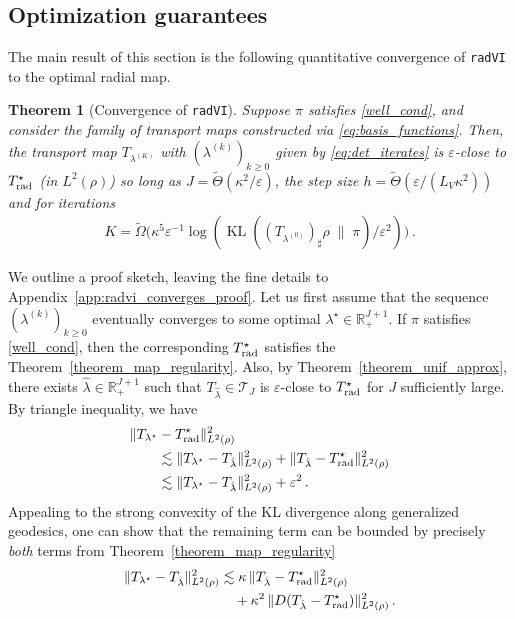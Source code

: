 \documentclass[twoside]{article}
\newcommand{\cT}{\mathcal{T}}
\newcommand{\1}{\mathds{1}}
\newcommand{\kl}[2]{\KL(#1 \!\;\|\; \!#2)}
\newcommand{\R}{\mathbb{R}}
\newcommand{\eps}{\varepsilon}
\renewcommand{\epsilon}{\varepsilon}
\DeclareMathOperator*{\KL}{KL}
\theoremstyle{plain}
\newtheorem{theorem}{Theorem}[section]
\theoremstyle{definition}
\theoremstyle{remark}
\renewcommand{\tilde}{\widetilde}
\begin{document}
\subsection{Optimization guarantees}\label{sec:opt_guarantees}
The main result of this section is the following quantitative convergence of \texttt{radVI} to the optimal radial map. 
{\begin{theorem}[Convergence of \texttt{radVI}]\label{thm:radvi_converges} Suppose $\pi$ satisfies \eqref{well_cond}, {and consider the family of transport maps constructed via \eqref{eq:basis_functions}.} Then, the transport map $T_{\lambda^{(K)}}$ with $(\lambda^{(k)})_{k\ge 0}$ given by \eqref{eq:det_iterates} is $\epsilon$-close to $T_{\rm rad}^\star$ (in $L^2(\rho)$) so long as $J = \tilde\Theta(\kappa^2/\eps)$, the step size $h = \widetilde\Theta(\eps/(L_V\kappa^2))$ and for iterations
\begin{align*}
     K = \tilde\Omega\bigl(\kappa^5\eps^{-1}\log(\kl{(T_{\lambda^{(0)}})_\sharp\rho}{\pi}/\eps^2)\bigr)\,.
\end{align*}
\end{theorem}}
{We outline a proof sketch, leaving the fine details to Appendix~\ref{app:radvi_converges_proof}.} Let us first assume that the sequence $(\lambda^{(k)})_{k \geq 0}$ eventually converges to some optimal $\lambda^\star \in \R^{J+1}_+$. If $\pi$ satisfies \eqref{well_cond}, then the corresponding $T^\star_{\rm rad}$ satisfies the Theorem~\ref{theorem_map_regularity}. Also, by Theorem~\ref{theorem_unif_approx}, there exists $\hat{\lambda} \in \R^{J+1}_+$ such that $T_{\hat{\lambda}} \in \cT_J$ is $\epsilon$-close to $T^\star_{\rm rad}$ for $J$ sufficiently large. By triangle inequality, we have
\begin{align*}
    &\| T_{\lambda^{\star}} - T^\star_{\rm rad}\|^2_{L^2(\rho)} \\
    &\qquad \lesssim \| T_{\lambda^{\star}} - T_{\hat\lambda}\|^2_{L^2(\rho)} + \| T_{\hat\lambda} - T^\star_{\rm rad}\|^2_{L^2(\rho)} \\
    &\qquad \lesssim \| T_{\lambda^{\star}} - T_{\hat\lambda}\|^2_{L^2(\rho)} + {\epsilon^2}\,.
\end{align*}
Appealing to the strong convexity of the KL divergence along generalized geodesics, one can show that the remaining term can be bounded by precisely \emph{both} terms from Theorem~\ref{theorem_map_regularity}
\begin{align}\label{eq:helper_inequality}
\begin{split}
    \| T_{\lambda^{\star}} - T_{\hat\lambda}\|^2_{L^2(\rho)} &\lesssim {\kappa}\, \| T_{\hat\lambda} - T^\star_{\rm rad}\|^2_{L^2(\rho)} \\
    &\quad + {\kappa^2}\, \| D(T_{\hat\lambda} - T^\star_{\rm rad})\|^2_{L^2(\rho)}\,.    
\end{split}
\raisetag{25pt} 
\end{align}
\end{document}
